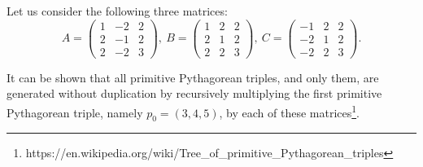 \documentclass[11pt, twoside, a4paper]{article}
\begin{document}
Let us consider the following three matrices:
\[
A = \left(\begin{matrix}  1 & -2 & 2 \\  2 & -1 & 2 \\  2 & -2 & 3 \end{matrix} \right)\!,\ 
B = \left(\begin{matrix}  1 &  2 & 2 \\  2 &  1 & 2 \\  2 &  2 & 3 \end{matrix} \right)\!,\
C = \left(\begin{matrix} -1 &  2 & 2 \\ -2 &  1 & 2 \\ -2 &  2 & 3 \end{matrix} \right)\!.
\]

It can be shown that all primitive Pythagorean triples, and only them, are generated without duplication by recursively multiplying the first primitive Pythagorean triple, namely $p_0=(3, 4, 5)$, by each of these matrices\footnote{https://en.wikipedia.org/wiki/Tree\_of\_primitive\_Pythagorean\_triples}.
\end{document}
